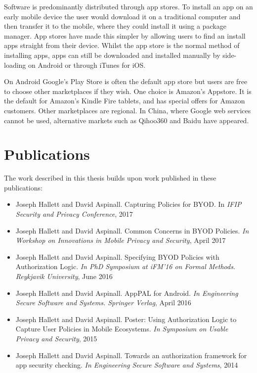 \documentclass[thesis.tex]{subfiles}
\begin{document}
Software is predominantly distributed through app stores.
To install an app on an early mobile device the user would
download it on a traditional computer and then transfer it to the
mobile, where they could install it using a package manager.  App
stores have made this simpler by allowing users to find
an install apps straight from their device.  Whilst the app store is
the normal method of installing apps, apps can still be downloaded and
installed manually by side-loading on Android or through iTunes for
iOS.

On Android Google's Play Store is often the
default app store but users are free to choose other marketplaces if they wish.
One choice is Amazon's Appstore.  It is the default for Amazon's
Kindle Fire tablets, and has special offers for Amazon customers.
Other marketplaces are regional.  In China, where Google web services
cannot be used, alternative markets such as Qihoo360 and Baidu have
appeared.

\section{Publications}

The work described in this thesis builds upon work published in these publications:

\begin{itemize}
\item 
Joseph Hallett and David Aspinall. Capturing Policies for BYOD. In \emph{IFIP Security and Privacy Conference}, 2017
\item Joseph Hallett and David Aspinall. Common Concerns in BYOD Policies. \emph{In Workshop on Innovations in Mobile Privacy and Security}, April 2017
\item Joseph Hallett and David Aspinall. Specifying BYOD Policies with Authorization Logic. \emph{In PhD Symposium at iFM'16 on Formal Methods. Reykjavik University}, June 2016
\item Joseph Hallett and David Aspinall. AppPAL for Android. \emph{In Engineering Secure Software and Systems. Springer Verlag}, April 2016
\item Joseph Hallett and David Aspinall. Poster: Using Authorization Logic to Capture User Policies in Mobile Ecosystems. \emph{In Symposium on Usable Privacy and Security}, 2015
\item Joseph Hallett and David Aspinall. Towards an authorization framework for app security checking. \emph{In Engineering Secure Software and Systems}, 2014
\end{itemize}
\end{document}
